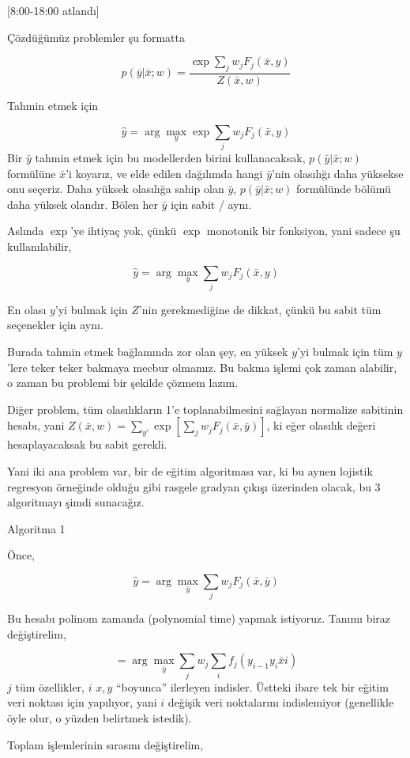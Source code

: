 \documentclass[12pt,fleqn]{article}\usepackage{../../common}
\begin{document}
[8:00-18:00 atlandı]

Çözdüğümüz problemler şu formatta

$$ p(\bar{y}|\bar{x};w) = \frac{\exp \sum_j w_j F_j (\bar{x},y)}{Z(\bar{x},w)} $$

Tahmin etmek için 

$$ \hat{y} = \arg\max_{y}  \exp \sum_j w_j F_j(\bar{x},y)$$
Bir $\bar{y}$ tahmin etmek için bu modellerden birini kullanacaksak, $
p(\bar{y}|\bar{x};w)$ formülüne $\bar{x}$'i koyarız, ve elde edilen
dağılımda hangi $\bar{y}$'nin olasılığı daha yüksekse onu seçeriz. Daha
yüksek olasılığa sahip olan $\bar{y}$, $p(\bar{y}|\bar{x};w)$ formülünde
bölümü daha yüksek olandır. Bölen her $\bar{y}$ için sabit / aynı.

Aslında $\exp$'ye ihtiyaç yok, çünkü $\exp$ monotonik bir fonksiyon, yani
sadece şu kullanılabilir,

$$ \hat{y} = \arg\max_{y}  \sum_j w_j F_j(\bar{x},y)$$

En olası $y$'yi bulmak için $Z$'nin gerekmediğine de dikkat, çünkü bu sabit
tüm seçenekler için aynı.

Burada tahmin etmek bağlamında zor olan şey, en yüksek $y$'yi bulmak
için tüm $y$'lere teker teker bakmaya mecbur olmamız. Bu bakma işlemi
çok zaman alabilir, o zaman bu problemi bir şekilde çözmem lazım. 

Diğer problem, tüm olasılıkların 1'e toplanabilmesini sağlayan normalize
sabitinin hesabı, yani $Z(\bar{x},w) = \sum_{y'}\exp [ \sum_j w_j F_j(\bar{x},\bar{y})]$, 
ki eğer olasılık değeri hesaplayacaksak bu sabit gerekli. 

Yani iki ana problem var, bir de eğitim algoritması var, ki bu aynen
lojistik regresyon örneğinde olduğu gibi rasgele gradyan çıkışı üzerinden
olacak, bu 3 algoritmayı şimdi sunacağız. 

Algoritma 1

Önce,

$$ \hat{y} = \arg\max_{\bar{y}}  \sum_j w_j F_j(\bar{x},\bar{y})$$

Bu hesabı polinom zamanda (polynomial time) yapmak istiyoruz. Tanımı biraz
değiştirelim, 

$$ = \arg\max_{\bar{y}}  \sum_j w_j \sum_i f_j(y_{i-1}y_i \bar{x} i )$$
$j$ tüm özellikler, $i$ $x,y$ ``boyunca'' ilerleyen indisler. Üstteki ibare
tek bir eğitim veri noktası için yapılıyor, yani $i$ değişik veri
noktalarını indislemiyor (genellikle öyle olur, o yüzden belirtmek
istedik). 

Toplam işlemlerinin sırasını değiştirelim, 
\end{document}
